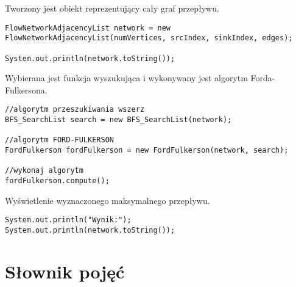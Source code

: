 \documentclass[10pt]{dokument-tiwo}
\begin{document}
Tworzony jest obiekt reprezentujący cały graf przepływu.
\begin{lstlisting}
FlowNetworkAdjacencyList network = new FlowNetworkAdjacencyList(numVertices, srcIndex, sinkIndex, edges);

System.out.println(network.toString());
\end{lstlisting}

Wybierana jest funkcja wyszukująca i wykonywany jest algorytm Forda-Fulkersona.
\begin{lstlisting}
//algorytm przeszukiwania wszerz
BFS_SearchList search = new BFS_SearchList(network);

//algorytm FORD-FULKERSON
FordFulkerson fordFulkerson = new FordFulkerson(network, search);

//wykonaj algorytm
fordFulkerson.compute();
\end{lstlisting}

Wyświetlenie wyznaczonego maksymalnego przepływu.
\begin{lstlisting}
System.out.println("Wynik:");
System.out.println(network.toString());
\end{lstlisting}


\section{Słownik pojęć}
\label{sec:slownik}
\end{document}

